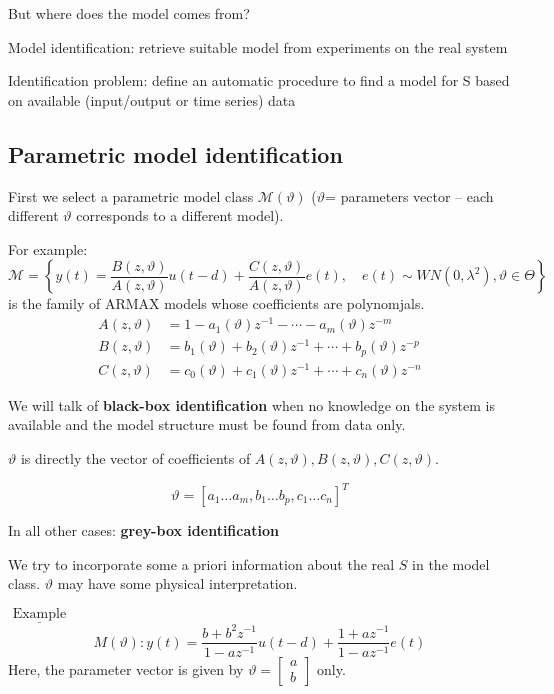 But where does the model comes from?

Model identification: retrieve suitable model from experiments on 
the real system 


Identification problem: define an automatic procedure to find a 
model for S based on available (input/output or time series) data 


\subsection{Parametric model identification}
First we select a parametric model class $\mathcal{M}(\vartheta)$
($\vartheta$= parameters vector – each different $\vartheta$ corresponds to a 
different model).

For example:
$$
\mathcal{M}=\left\{y(t)=\frac{B(z, \vartheta)}{A(z, \vartheta)} u(t-d)+\frac{C(z, \vartheta)}{A(z, \vartheta)} e(t), \quad e(t) \sim WN\left(0, \lambda^{2}\right), \vartheta\in\Theta\right\}
$$
is the family of ARMAX models whose coefficients are polynomjals.
\begin{align*}
	A(z, \vartheta)&=1-a_{1}(\vartheta) z^{-1}-\cdots-a_{m}(\vartheta) z^{-m} \\
	B(z, \vartheta)&=b_{1}(\vartheta)+b_{2}(\vartheta) z^{-1}+\cdots+b_{p}(\vartheta) z^{-p}\\
	C(z, \vartheta)&=c_0(\vartheta)+c_{1}(\vartheta) z^{-1}+\cdots+c_{n}(\vartheta) z^{-n}
\end{align*}

We will talk of \textbf{black-box identification} when no knowledge 
on the system is available and the model structure must be found from 
data only.

$\vartheta$ is directly the vector of coefficients of $A(z, \vartheta),B(z, \vartheta),C(z, \vartheta)$.

$$
\vartheta=\left[
	a_{1}  \ldots a_{m},  b_{1} \ldots b_{p} ,c_{1} \ldots c_{n}
\right]^{T}
$$

In all other cases: \textbf{grey-box identification}

We try to incorporate some a priori information about the real $S$ in the model class. $\vartheta$ may have some physical interpretation.

$\underline{\text { Example }}$
$$
M(\vartheta): y(t)=\frac{b+b^{2} z^{-1}}{1-a z^{-1}} u(t-d)+\frac{1+a z^{-1}}{1-a z^{-1}} e(t)
$$
Here, the parameter vector is given by $\vartheta=\left[\begin{array}{l}a \\ b\end{array}\right]$ only.



